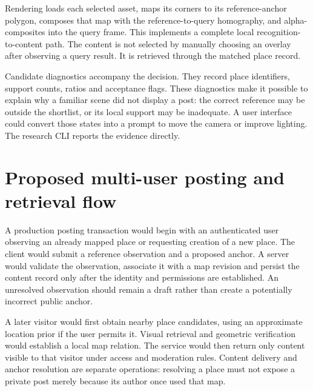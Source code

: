 Rendering loads each selected asset, maps its corners to its reference-anchor polygon, composes that map with the reference-to-query homography, and alpha-composites into the query frame. This implements a complete local recognition-to-content path. The content is not selected by manually choosing an overlay after observing a query result. It is retrieved through the matched place record.

Candidate diagnostics accompany the decision. They record place identifiers, support counts, ratios and acceptance flags. These diagnostics make it possible to explain why a familiar scene did not display a post: the correct reference may be outside the shortlist, or its local support may be inadequate. A user interface could convert those states into a prompt to move the camera or improve lighting. The research CLI reports the evidence directly.

\ifFullReport
\section{Proposed multi-user posting and retrieval flow}
\designnote
A production posting transaction would begin with an authenticated user observing an already mapped place or requesting creation of a new place. The client would submit a reference observation and a proposed anchor. A server would validate the observation, associate it with a map revision and persist the content record only after the identity and permissions are established. An unresolved observation should remain a draft rather than create a potentially incorrect public anchor.

A later visitor would first obtain nearby place candidates, using an approximate location prior if the user permits it. Visual retrieval and geometric verification would establish a local map relation. The service would then return only content visible to that visitor under access and moderation rules. Content delivery and anchor resolution are separate operations: resolving a place must not expose a private post merely because its author once used that map.

